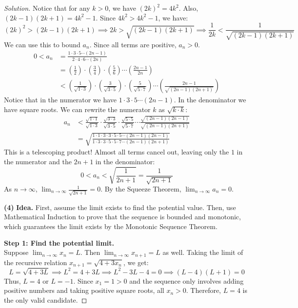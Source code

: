 \documentclass[11pt]{article}
\theoremstyle{definition}
\newenvironment{solution}{\begin{proof}[Solution]}{\end{proof}}
\begin{document}
\begin{solution}
Notice that for any $k > 0$, we have $(2k)^2 = 4k^2$. Also, $(2k-1)(2k+1) = 4k^2 - 1$.
Since $4k^2 > 4k^2 - 1$, we have:
\[
(2k)^2 > (2k-1)(2k+1) \implies 2k > \sqrt{(2k-1)(2k+1)} \implies \frac{1}{2k} < \frac{1}{\sqrt{(2k-1)(2k+1)}}
\]
We can use this to bound $a_n$. Since all terms are positive, $a_n > 0$.
\begin{align*}
0 < a_n &= \frac{1\cdot 3\cdot 5 \cdots (2n-1)}{2\cdot 4\cdot 6 \cdots (2n)} \\
&= \left(\frac{1}{2}\right) \cdot \left(\frac{3}{4}\right) \cdot \left(\frac{5}{6}\right) \cdots \left(\frac{2n-1}{2n}\right) \\
&< \left(\frac{1}{\sqrt{1 \cdot 3}}\right) \cdot \left(\frac{3}{\sqrt{3 \cdot 5}}\right) \cdot \left(\frac{5}{\sqrt{5 \cdot 7}}\right) \cdots \left(\frac{2n-1}{\sqrt{(2n-1)(2n+1)}}\right)
\end{align*}
Notice that in the numerator we have $1 \cdot 3 \cdot 5 \cdots (2n-1)$. In the denominator we have square roots. We can rewrite the numerator $k$ as $\sqrt{k \cdot k}$:
\begin{align*}
a_n &< \frac{\sqrt{1 \cdot 1}}{\sqrt{1 \cdot 3}} \cdot \frac{\sqrt{3 \cdot 3}}{\sqrt{3 \cdot 5}} \cdot \frac{\sqrt{5 \cdot 5}}{\sqrt{5 \cdot 7}} \cdots \frac{\sqrt{(2n-1)(2n-1)}}{\sqrt{(2n-1)(2n+1)}} \\
&= \sqrt{ \frac{1 \cdot 1 \cdot 3 \cdot 3 \cdot 5 \cdot 5 \cdots (2n-1)(2n-1)}{1 \cdot 3 \cdot 3 \cdot 5 \cdot 5 \cdot 7 \cdots (2n-1)(2n+1)} }
\end{align*}
This is a telescoping product! Almost all terms cancel out, leaving only the $1$ in the numerator and the $2n+1$ in the denominator:
\[
0 < a_n < \sqrt{ \frac{1}{2n+1} } = \frac{1}{\sqrt{2n+1}}
\]
As $n \to \infty$, $\lim_{n \to \infty} \frac{1}{\sqrt{2n+1}} = 0$.
By the Squeeze Theorem, $\lim_{n \to \infty} a_n = 0$.

\textbf{(4)} \textbf{Idea.} First, assume the limit exists to find the potential value. Then, use Mathematical Induction to prove that the sequence is bounded and monotonic, which guarantees the limit exists by the Monotonic Sequence Theorem.

\textbf{Step 1: Find the potential limit.} \\
Suppose $\lim_{n \to \infty} x_n = L$. Then $\lim_{n \to \infty} x_{n+1} = L$ as well.
Taking the limit of the recursive relation $x_{n+1} = \sqrt{4+3x_n}$, we get:
\[
L = \sqrt{4+3L} \implies L^2 = 4+3L \implies L^2 - 3L - 4 = 0 \implies (L-4)(L+1) = 0
\]
Thus, $L = 4$ or $L = -1$. Since $x_1 = 1 > 0$ and the sequence only involves adding positive numbers and taking positive square roots, all $x_n > 0$. Therefore, $L = 4$ is the only valid candidate.


\end{solution}
\end{document}
